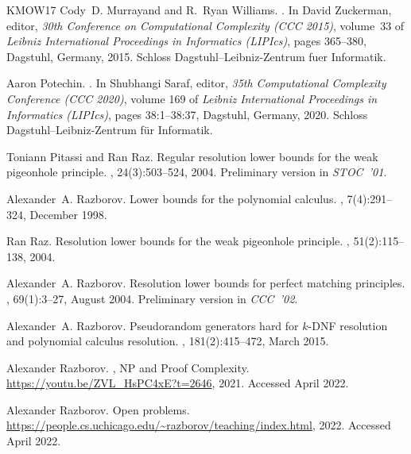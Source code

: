 \documentclass[10pt,a4paper]{article}
\theoremstyle{plain}
\theoremstyle{remark}
\theoremstyle{definition}
\begin{document}
\begin{thebibliography}{KMOW17}
Cody~D. Murrayand and R.~Ryan Williams.
.
\newblock In David Zuckerman, editor, {\em 30th Conference on Computational
  Complexity (CCC 2015)}, volume~33 of {\em Leibniz International Proceedings
  in Informatics (LIPIcs)}, pages 365--380, Dagstuhl, Germany, 2015. Schloss
  Dagstuhl--Leibniz-Zentrum fuer Informatik.

Aaron Potechin.
.
\newblock In Shubhangi Saraf, editor, {\em 35th Computational Complexity
  Conference (CCC 2020)}, volume 169 of {\em Leibniz International Proceedings
  in Informatics (LIPIcs)}, pages 38:1--38:37, Dagstuhl, Germany, 2020. Schloss
  Dagstuhl--Leibniz-Zentrum f{\"u}r Informatik.

Toniann Pitassi and Ran Raz.
\newblock Regular resolution lower bounds for the weak pigeonhole principle.
, 24(3):503--524, 2004.
\newblock Preliminary version in \emph{STOC~'01}.

Alexander~A. Razborov.
\newblock Lower bounds for the polynomial calculus.
, 7(4):291\nobreakdash--324, December
  1998.

Ran Raz.
\newblock Resolution lower bounds for the weak pigeonhole principle.
, 51(2):115--138, 2004.

Alexander~A. Razborov.
\newblock Resolution lower bounds for perfect matching principles.
,
  69(1):3\nobreakdash--27, August 2004.
\newblock Preliminary version in \emph{CCC~'02}.

Alexander~A. Razborov.
\newblock Pseudorandom generators hard for \mbox{$k$-{DNF}} resolution and
  polynomial calculus resolution.
, 181(2):415\nobreakdash--472, March 2015.

Alexander Razborov.
, {NP} and {Proof Complexity}.
\newblock \url{https://youtu.be/ZVL_HsPC4xE?t=2646}, 2021.
\newblock Accessed April 2022.

Alexander Razborov.
\newblock Open problems.
\newblock \url{https://people.cs.uchicago.edu/~razborov/teaching/index.html},
  2022.
\newblock Accessed April 2022.


\end{thebibliography}
\end{document}
